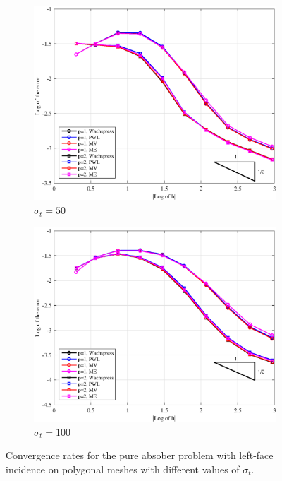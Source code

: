 \begin{figure}
{}
\vspace{1cm}
{
	\begin{subfigure}[b]{0.485\textwidth}
		\centering
		\label{subfig::PA_Left_Poly_sig50}
		\includegraphics[width=\textwidth]{figures/sec_BF/PAErr_Left_Poly_sig50.eps}
	\caption{$\sigma_t = 50$}
	\end{subfigure}
	\hfill
	\begin{subfigure}[b]{0.485\textwidth}
		\centering
		\label{subfig::PA_Left_Poly_sig100}
		\includegraphics[width=\textwidth]{figures/sec_BF/PAErr_Left_Poly_sig100.eps}
	\caption{$\sigma_t = 100$}
	\end{subfigure}
}
\caption{Convergence rates for the pure absober problem with left-face incidence on polygonal meshes with different values of $\sigma_t$.}
\label{fig::BF_Results_PA_Left_Poly}
\end{figure}

